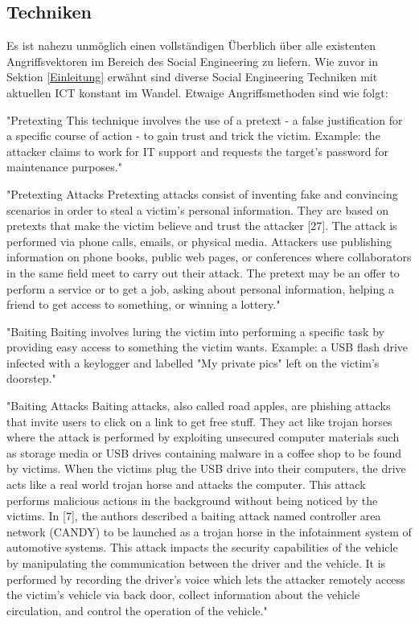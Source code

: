 \subsection{Techniken}

Es ist nahezu unmöglich einen vollständigen Überblich über alle existenten Angriffsvektoren im Bereich des Social Engineering
zu liefern. Wie zuvor in Sektion \ref{Einleitung} erwähnt sind diverse Social Engineering Techniken mit aktuellen ICT konstant im Wandel.
Etwaige Angriffsmethoden sind wie folgt:

"Pretexting
This technique involves the use of a pretext -  a false justification for a specific course of action - to gain
trust and trick the victim.
Example: the attacker claims to work for IT support and requests the target's password for maintenance purposes."\cite{1_enisa}

"Pretexting Attacks
Pretexting attacks consist of inventing fake and convincing scenarios in order to steal a victim’s personal information.
They are based on pretexts that make the victim believe and trust the attacker [27]. The attack is performed via phone calls,
emails, or physical media. Attackers use publishing information on phone books, public web pages, or conferences where collaborators
in the same field meet to carry out their attack. The pretext may be an offer to perform a service or to get a job,
asking about personal information, helping a friend to get access to something, or winning a lottery."\cite{4_mdpi}

"Baiting
Baiting involves luring the victim into performing a specific task by providing easy access to something the victim wants.
Example: a USB flash drive infected with a keylogger and labelled "My private pics" left on the victim's doorstep."\cite{1_enisa}

"Baiting Attacks
Baiting attacks, also called road apples, are phishing attacks that invite users to click on a link to get free stuff.
They act like trojan horses where the attack is performed by exploiting unsecured computer materials such as storage media
or USB drives containing malware in a coffee shop to be found by victims. When the victims plug the USB drive into their computers,
the drive acts like a real world trojan horse and attacks the computer. This attack performs malicious actions in the background
without being noticed by the victims.
In [7], the authors described a baiting attack named controller area network (CANDY) to be launched as a trojan horse in
the infotainment system of automotive systems. This attack impacts the security capabilities of the vehicle by manipulating the
communication between the driver and the vehicle. It is performed by recording the driver’s voice which lets the attacker remotely
access the victim’s vehicle via back door, collect information about the vehicle circulation, and control the operation of the vehicle."\cite{4_mdpi}

